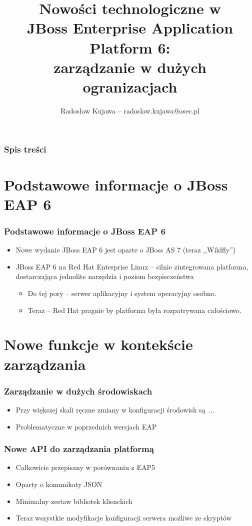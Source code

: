 \documentclass[dvipsnames,table]{beamer}
\title{Nowości technologiczne w \\ JBoss Enterprise Application Platform 6: \\ zarządzanie w dużych ogranizacjach}
\author{Radosław Kujawa -- radoslaw.kujawa@osec.pl}
\institute{OSEC}
\begin{document}
\begin{frame}
\titlepage
\end{frame}

\begin{frame}[allowframebreaks]
\frametitle{Spis treści}
{
\hypersetup{colorlinks=true,linkcolor=black,urlcolor=OSEC-red}
\tableofcontents
}
\end{frame}


\section{Podstawowe informacje o JBoss EAP 6}

\begin{frame}
\frametitle{Podstawowe informacje o JBoss EAP 6}
\begin{itemize}
	\item Nowe wydanie JBoss EAP 6 jest oparte o JBoss AS 7 (teraz ,,Wildfly'')
	
	\item JBoss EAP 6 na Red Hat Enterprise Linux -- silnie zintegrowana platforma, dostarczająca jednolite narzędzia i poziom bezpieczeństwa
	\begin{itemize}
		\item Do tej pory -- serwer aplikacyjny i system operacyjny osobno.
		\item Teraz -- Red Hat pragnie by platforma była rozpatrywana całościowo.
	\end{itemize}
\end{itemize}
\end{frame}


\section{Nowe funkcje w kontekście zarządzania}

\begin{frame}
\frametitle{Zarządzanie w dużych środowiskach}
\begin{itemize}

	\item Przy większej skali ręczne zmiany w konfiguracji środowisk są ...
	\item Problematyczne w poprzednich wersjach EAP

\end{itemize}
\end{frame}

\begin{frame}
\frametitle{Nowe API do zarządzania platformą}
\begin{itemize}
	\item Całkowicie przepisany w porównaniu z EAP5
	\item Oparty o komunikaty JSON
	\item Minimalny zestaw bibliotek klienckich
	\item Teraz wszystkie modyfikacje konfiguracji serwera możliwe ze skryptów
\end{itemize}
\end{frame}
\end{document}
